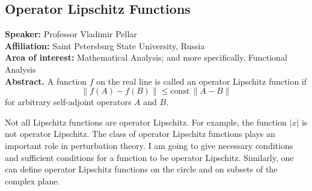 %
%
\subsection*{Operator Lipschitz Functions} %
\noindent
\textbf{Speaker:} Professor Vladimir Pellar \\ %
\textbf{Affiliation:} Saint Petersburg State University, Russia \\ %
\textbf{Area of interest:} Mathematical Analysis; and more specifically, Functional Analysis \\

\noindent\textbf{Abstract.} A function \(f\) on the real line is called an operator Lipschitz function if
\[
    \|f(A)-f(B)\|\le \text{const} \, \|A-B\|
\]
for arbitrary self-adjoint operators \(A\) and \(B\).

Not all Lipschitz functions are operator Lipschitz. For example, the function \(|x|\) is not operator Lipschitz.
The class of operator Lipschitz functions plays an important role in perturbation theory.
I am going to give necessary conditions and sufficient conditions for a function to be operator Lipschitz. 
Similarly, one can define operator Lipschitz functions on the circle and on subsets of the complex plane.



